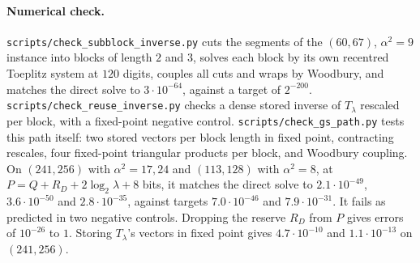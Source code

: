 \documentclass[11pt]{article}
\theoremstyle{remark}\newtheorem*{remark}{Remark}
\begin{document}
\paragraph{Numerical check.} \texttt{scripts/check\_subblock\_inverse.py} cuts the
segments of the $(60,67)$, $\alpha^2=9$ instance into blocks of length $2$ and $3$, solves each
block by its own recentred Toeplitz system at $120$ digits, couples all cuts and wraps by
Woodbury, and matches the direct solve to $3\cdot10^{-64}$, against a target of $2^{-200}$.
\texttt{scripts/check\_reuse\_inverse.py} checks a dense stored inverse of $T_\lambda$ rescaled per block, with a fixed-point negative control. \texttt{scripts/check\_gs\_path.py} tests this path itself: two stored vectors per block
length in fixed point, contracting rescales, four fixed-point triangular products per block,
and Woodbury coupling. On $(241,256)$ with $\alpha^2=17,24$ and $(113,128)$ with $\alpha^2=8$, at
$P=Q+R_D+2\log_2\lambda+8$ bits, it matches the direct solve to $2.1\cdot10^{-49}$,
$3.6\cdot10^{-50}$ and $2.8\cdot10^{-35}$, against targets $7.0\cdot10^{-46}$ and $7.9\cdot10^{-31}$.
It fails as predicted in two negative controls. Dropping the reserve $R_D$ from $P$ gives
errors of $10^{-26}$ to $1$. Storing $T_\lambda$'s vectors in fixed point gives
$4.7\cdot10^{-10}$ and $1.1\cdot10^{-13}$ on $(241,256)$.
\end{document}
